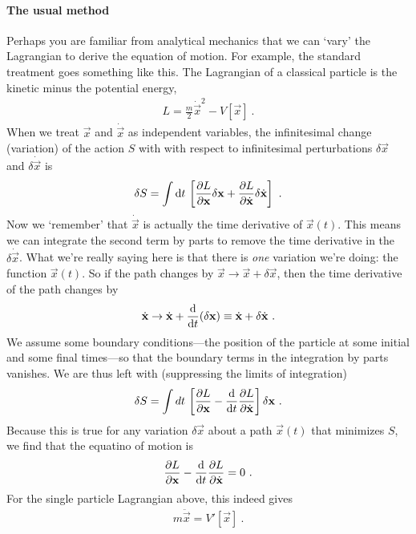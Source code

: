 \documentclass[12pt, oneside]{report}    %
\begin{document}
\paragraph{The usual method}
Perhaps you are familiar from analytical mechanics that we can `vary' the Lagrangian to derive the equation of motion. For example, the standard treatment goes something like this. The Lagrangian of a classical particle is the kinetic minus the potential energy,
\begin{align}
    L = \frac{m}{2} \dot{\vec{x}}^2 - V[\vec{x}] \ .
\end{align}
When we treat $\vec{x}$ and $\dot{\vec{x}}$ as independent variables, the infinitesimal change (variation) of the action $S$ with with respect to infinitesimal perturbations $\delta\vec{x}$ and $\delta\dot{\vec{x}}$ is
\begin{align}
    \delta S =
    \int \operatorname{d}\!{t} \,
    \left[
    \frac{\partial L}{\partial \mathbf{x}} \delta\mathbf{x}
    +
    \frac{\partial L}{\partial \dot{\mathbf{x}}}\delta\dot{\mathbf{x}}
    \right] \ .
\end{align}
Now we `remember' that $\dot{\vec{x}}$ is actually the time derivative of $\vec{x}(t)$. This means we can integrate the second term by parts to remove the time derivative in the $\delta\dot{\vec{x}}$. What we're really saying here is that there is \emph{one} variation we're doing: the function $\vec{x}(t)$. So if the path changes by $\vec{x}\to\vec{x}+\delta\vec{x}$, then the time derivative of the path changes by
\begin{align}
    \dot{\mathbf{x}} 
    \to \dot{\mathbf{x}} 
    + \frac{\operatorname{d}\!{}}{\operatorname{d}\!{t}}(\delta\mathbf{x}) 
    \equiv \dot{\mathbf{x}} + \delta\dot{\mathbf{x}} \ . 
\end{align}
We assume some boundary conditions---the position of the particle at some initial and some final times---so that the boundary terms in the integration by parts vanishes. We are thus left with (suppressing the limits of integration)
\begin{align}
    \delta S = \int dt\, 
    \left[
    \frac{\partial L}{\partial \mathbf{x}}
    - 
    \frac{\operatorname{d}\!{}}{\operatorname{d}\!{t}}
    \frac{\partial L}{\partial \dot{\mathbf{x}}} 
    \right]\delta\mathbf{x} \ .
\end{align}
Because this is true for any variation $\delta\vec{x}$ about a path $\vec{x}(t)$ that minimizes $S$, we find that the equatino of motion is 
\begin{align}
    \frac{\partial L}{\partial \mathbf{x}}
    - 
    \frac{\operatorname{d}\!{}}{\operatorname{d}\!{t}}
    \frac{\partial L}{\partial \dot{\mathbf{x}}}  = 0 \ .
\end{align}
For the single particle Lagrangian above, this indeed gives
\begin{align}
    m\ddot{\vec{x}} = V'[\vec{x}] \ .
\end{align}
\end{document}
